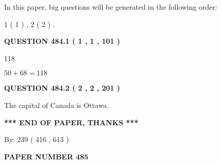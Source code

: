 \documentclass[12pt]{article}
\begin{document}
In this paper, big questions will be generated in the following order: 
   
   
   1 ( 1 )
 ,
   2 ( 2 )
 .
  
\vspace{0.2in}
  
{\textbf{\Large{QUESTION
484.1 
 ( 1 , 1 , 101 )
}}}
  
  
 
 
\noindent{}

118
 
 
 
 
\noindent{}

$ %
50 +  %
68=   %
118$
 
 
  
\vspace{0.2in}
  
{\textbf{\Large{QUESTION
484.2 
 ( 2 , 2 , 201 )
}}}
  
  
 
 
\noindent{}
 
 
The capital of Canada is Ottawa.
 
 
 
 
   
   
 \vspace{0.2in}
 
   
   
   
   
\vspace{1.0in} 
{\textbf{\large{ *** END OF PAPER, THANKS *** }}} 
   
   
\hspace{1.0in} By: 
 239 ( 416 ,  613 )
   
   
   
   
\newpage 
\setcounter{page}{ 
   485001 } 
   
   
   
   
 {\textbf{ \Large{ PAPER NUMBER  485  }}}
   
   
\vspace{0.2in}
   
   
   
   
   
\end{document}
